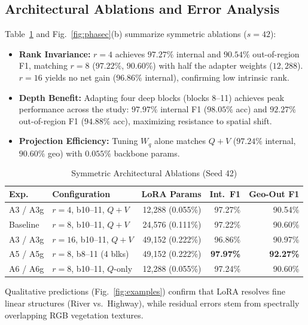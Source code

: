 \documentclass[conference]{IEEEtran}
\begin{document}
\subsection{Architectural Ablations and Error Analysis}
Table~\ref{tab:ablations} and Fig.~\ref{fig:phasec}(b) summarize symmetric ablations ($s=42$):
\begin{itemize}
    \item \textbf{Rank Invariance:} $r=4$ achieves $97.27\%$ internal and $90.54\%$ out-of-region F1, matching $r=8$ ($97.22\%$, $90.60\%$) with half the adapter weights ($12,288$). $r=16$ yields no net gain ($96.86\%$ internal), confirming low intrinsic rank.
    \item \textbf{Depth Benefit:} Adapting four deep blocks (blocks 8--11) achieves peak performance across the study: $\mathbf{97.97\%}$ internal F1 ($98.05\%$ acc) and $\mathbf{92.27\%}$ out-of-region F1 ($94.88\%$ acc), maximizing resistance to spatial shift.
    \item \textbf{Projection Efficiency:} Tuning $W_q$ alone matches $Q+V$ ($97.24\%$ internal, $90.60\%$ geo) with $0.055\%$ backbone params.
\end{itemize}

\begin{table}[t]
\centering
\scriptsize
\setlength{\tabcolsep}{3.5pt}
\caption{Symmetric Architectural Ablations (Seed 42)}
\label{tab:ablations}
\begin{tabular}{@{}llrrr@{}}
\toprule
\textbf{Exp.} & \textbf{Configuration} & \textbf{LoRA Params} & \textbf{Int.\ F1} & \textbf{Geo-Out F1} \\
\midrule
A3 / A3g & $r=4$, b10--11, $Q+V$ & 12,288 (0.055\%) & 97.27\% & 90.54\% \\
Baseline & $r=8$, b10--11, $Q+V$ & 24,576 (0.111\%) & 97.22\% & 90.60\% \\
A3 / A3g & $r=16$, b10--11, $Q+V$ & 49,152 (0.222\%) & 96.86\% & 90.97\% \\
A5 / A5g & $r=8$, b8--11 (4 blks) & 49,152 (0.222\%) & \textbf{97.97\%} & \textbf{92.27\%} \\
A6 / A6g & $r=8$, b10--11, $Q$-only & 12,288 (0.055\%) & 97.24\% & 90.60\% \\
\bottomrule
\end{tabular}
\end{table}

Qualitative predictions (Fig.~\ref{fig:examples}) confirm that LoRA resolves fine linear structures (River vs.\ Highway), while residual errors stem from spectrally overlapping RGB vegetation textures.
\end{document}
